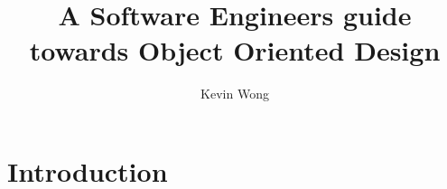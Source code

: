 \documentclass{article}
\title{A Software Engineers guide towards Object Oriented Design}
\author{Kevin Wong}
\date{ }
\begin{document}
    \maketitle

    \section{Introduction}
    
    
    
    
    
\end{document}
